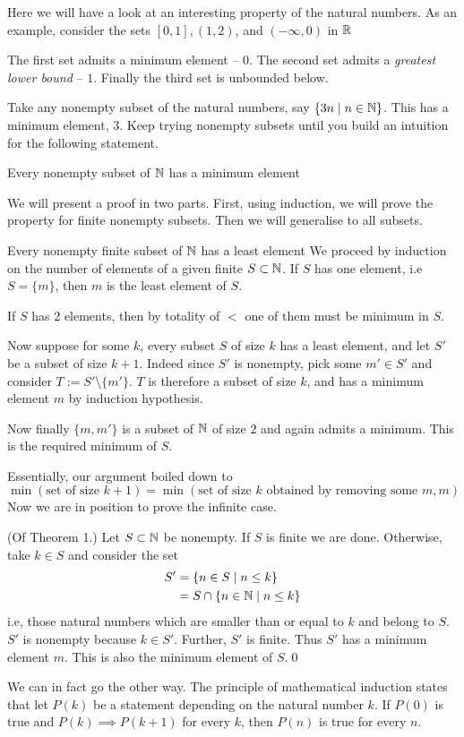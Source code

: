 

Here we will have a look at an interesting property of the natural numbers. As an example, consider the sets $[0, 1], (1, 2)$, and $(-\infty, 0)$ in $\mathbb{R}$

The first set admits a minimum element -- $0$. The second set admits a \emph{greatest lower bound} -- $1$. Finally the third set is unbounded below.

Take any nonempty subset of the natural numbers, say $\{3n \space \mid \space n \in \mathbb{N}\}$. This has a minimum element, $3$. Keep trying nonempty subsets until you build an intuition for the following statement.

\begin{SNP}{\thm}{Every nonempty subset of $\mathbb{N}$ has a minimum element}
\end{SNP}

We will present a proof in two parts. First, using induction, we will prove the property for finite nonempty subsets. Then we will generalise to all subsets.

\begin{SWP}{\lm}{Every nonempty finite subset of $\mathbb{N}$ has a least element}
We proceed by induction on the number of elements of a given finite $S \subset \mathbb{N}$. If $S$ has one element, i.e $S = \{m\}$, then $m$ is the least element of $S$.

If $S$ has $2$ elements, then by totality of $<$ one of them must be minimum in $S$.

Now suppose for some $k$, every subset $S$ of size $k$ has a least element, and let $S'$ be a subset of size $k + 1$. Indeed since $S'$ is nonempty, pick some $m' \in S'$ and consider $T := S' \setminus \{m'\}$. $T$ is therefore a subset of size $k$, and has a minimum element $m$ by induction hypothesis.

Now finally $\{m, m'\}$ is a subset of $\mathbb{N}$ of size $2$ and again admits a minimum. This is the required minimum of $S$.
\end{SWP}
Essentially, our argument boiled down to
$$
\min (\text{set of size } k + 1) = \min(\text{set of size } k \text{ obtained by removing some }m, m)
$$
Now we are in position to prove the infinite case.
\begin{smrg}
\pf (Of Theorem 1.) Let $S \subset \mathbb{N}$ be nonempty. If $S$ is finite we are done. Otherwise, take $k \in S$ and consider the set
\begin{align*}
S' &= \{n \in S \space \mid \space n \leq k\} \\
&= S \cap \{n \in \mathbb{N} \space \mid \space n \leq k\}
\end{align*}
i.e, those natural numbers which are smaller than or equal to $k$ and belong to $S$. $S'$ is nonempty because $k \in S'$. Further, $S'$ is finite. Thus $S'$ has a minimum element $m$. This is also the minimum element of $S$.\qed
\end{smrg}
\newpage
We can in fact go the other way. The principle of mathematical induction states that let $P(k)$ be a statement depending on the natural number $k$. If $P(0)$ is true and $P(k) \implies P(k + 1)$ for every $k$, then $P(n)$ is true for every $n$.

